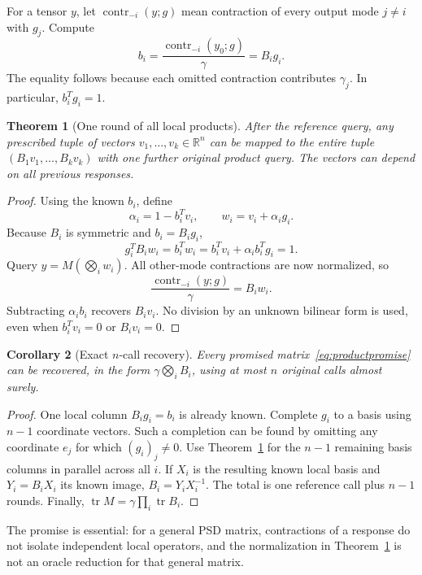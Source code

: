 \documentclass[11pt]{article}
\newtheorem{theorem}{Theorem}[section]
\newtheorem{corollary}[theorem]{Corollary}
\theoremstyle{definition}\newtheorem{definition}[theorem]{Definition}
\theoremstyle{remark}\newtheorem{remark}[theorem]{Remark}
\newcommand{\R}{\mathbb R}\newcommand{\C}{\mathbb C}
\newcommand{\tr}{\operatorname{tr}}\newcommand{\rank}{\operatorname{rank}}
\newcommand{\contract}{\operatorname{contr}}
\begin{document}
For a tensor $y$, let $\contract_{-i}(y;g)$ mean contraction of every output mode
$j\ne i$ with $g_j$. Compute
\begin{equation}\label{eq:bi}
 b_i=\frac{\contract_{-i}(y_0;g)}{\gamma}=B_i g_i.
\end{equation}
The equality follows because each omitted contraction contributes $\gamma_j$.
In particular, $b_i^Tg_i=1$.

\begin{theorem}[One round of all local products]\label{thm:parallel}
After the reference query, any prescribed tuple of vectors
$v_1,\ldots,v_k\in\R^n$ can be mapped to the entire tuple
$(B_1v_1,\ldots,B_kv_k)$ with one further original product query.
The vectors can depend on all previous responses.
\end{theorem}
\begin{proof}
Using the known $b_i$, define
\begin{equation}\label{eq:shift}
 \alpha_i=1-b_i^Tv_i,\qquad w_i=v_i+\alpha_i g_i.
\end{equation}
Because $B_i$ is symmetric and $b_i=B_i g_i$,
\[
 g_i^TB_iw_i=b_i^Tw_i=b_i^Tv_i+\alpha_i b_i^Tg_i=1.
\]
Query $y=M(\bigotimes_i w_i)$. All other-mode contractions are now normalized,
so
\[
 \frac{\contract_{-i}(y;g)}\gamma=B_iw_i.
\]
Subtracting $\alpha_i b_i$ recovers $B_i v_i$. No division by an unknown
bilinear form is used, even when $b_i^Tv_i=0$ or $B_iv_i=0$.
\end{proof}

\begin{corollary}[Exact $n$-call recovery]\label{cor:exactn}
Every promised matrix~\eqref{eq:productpromise} can be recovered, in the form
$\gamma\bigotimes_i B_i$, using at most $n$ original calls almost surely.
\end{corollary}
\begin{proof}
One local column $B_i g_i=b_i$ is already known. Complete $g_i$ to a basis using
$n-1$ coordinate vectors. Such a completion can be found by omitting any
coordinate $e_j$ for which $(g_i)_j\ne0$.
Use Theorem~\ref{thm:parallel} for the $n-1$ remaining basis columns in parallel
across all $i$. If $X_i$ is the resulting known local basis and $Y_i=B_iX_i$ its
known image, $B_i=Y_iX_i^{-1}$. The total is one reference call plus $n-1$ rounds.
Finally, $\tr M=\gamma\prod_i\tr B_i$.
\end{proof}

The promise is essential: for a general PSD matrix, contractions of a response
do not isolate independent local operators, and the normalization in
Theorem~\ref{thm:parallel} is not an oracle reduction for that general matrix.
\end{document}
